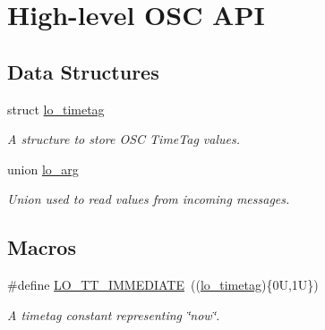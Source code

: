 \hypertarget{group__liblo}{\section{High-\/level O\+S\+C A\+P\+I}
\label{group__liblo}
}
\subsection*{Data Structures}
\begin{DoxyCompactItemize}
\item 
struct \hyperlink{structlo__timetag}{lo\+\_\+timetag}
\begin{DoxyCompactList}\small\item\em A structure to store O\+S\+C Time\+Tag values. \end{DoxyCompactList}\item 
union \hyperlink{unionlo__arg}{lo\+\_\+arg}
\begin{DoxyCompactList}\small\item\em Union used to read values from incoming messages. \end{DoxyCompactList}\end{DoxyCompactItemize}
\subsection*{Macros}
\begin{DoxyCompactItemize}
\item 
\#define \hyperlink{group__liblo_gafa8cfc08b763b0c039fb64a73c4c77da}{L\+O\+\_\+\+T\+T\+\_\+\+I\+M\+M\+E\+D\+I\+A\+T\+E}~((\hyperlink{structlo__timetag}{lo\+\_\+timetag})\{0\+U,1\+U\})
\begin{DoxyCompactList}\small\item\em A timetag constant representing \char`\"{}now\char`\"{}. \end{DoxyCompactList}\end{DoxyCompactItemize}
